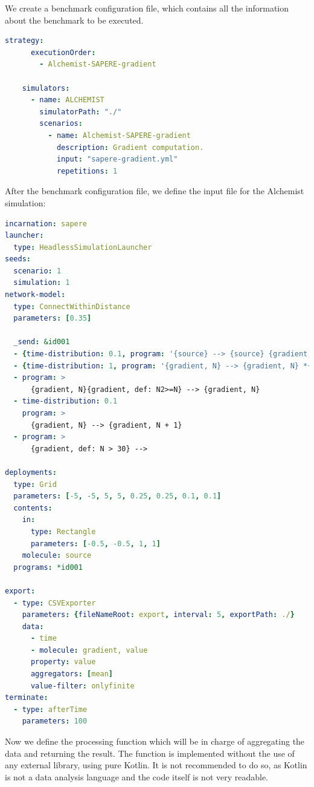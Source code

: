 \documentclass[12pt,a4paper,openright,twoside]{book}
\begin{document}
We create a benchmark configuration file, which contains all the information about the benchmark to be executed.

\begin{lstlisting}[language=yaml, caption={Case of study: benchmark configuration file}]
    strategy:
      executionOrder:
        - Alchemist-SAPERE-gradient
    
    simulators:
      - name: ALCHEMIST
        simulatorPath: "./"
        scenarios:
          - name: Alchemist-SAPERE-gradient
            description: Gradient computation.
            input: "sapere-gradient.yml"
            repetitions: 1
\end{lstlisting}

After the benchmark configuration file, we define the input file for the Alchemist simulation:

\begin{lstlisting}[language=yaml, caption={Case of study: Alchemist input file}]
incarnation: sapere
launcher:
  type: HeadlessSimulationLauncher
seeds:
  scenario: 1
  simulation: 1
network-model:
  type: ConnectWithinDistance
  parameters: [0.35]

  _send: &id001
  - {time-distribution: 0.1, program: '{source} --> {source} {gradient, 0}'}
  - {time-distribution: 1, program: '{gradient, N} --> {gradient, N} *{gradient, N+#D}'}
  - program: >
      {gradient, N}{gradient, def: N2>=N} --> {gradient, N}
  - time-distribution: 0.1
    program: >
      {gradient, N} --> {gradient, N + 1}
  - program: >
      {gradient, def: N > 30} -->

deployments:
  type: Grid
  parameters: [-5, -5, 5, 5, 0.25, 0.25, 0.1, 0.1]
  contents:
    in:
      type: Rectangle
      parameters: [-0.5, -0.5, 1, 1]
    molecule: source
  programs: *id001
  
export:
  - type: CSVExporter
    parameters: {fileNameRoot: export, interval: 5, exportPath: ./}
    data: 
      - time
      - molecule: gradient, value
      property: value
      aggregators: [mean]
      value-filter: onlyfinite
terminate:
  - type: afterTime
    parameters: 100
\end{lstlisting}

Now we define the processing function which will be in charge of aggregating the data and returning the result.
The function is implemented without the use of any external library, using pure Kotlin.
It is not recommended to do so, as Kotlin is not a data analysis language and the code itself is not very readable.
\end{document}

